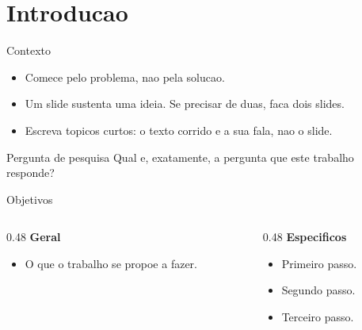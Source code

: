 \section{Introducao}

\begin{frame}{Contexto}
  \begin{itemize}
    \item Comece pelo problema, nao pela solucao.
    \item Um slide sustenta uma ideia. Se precisar de duas, faca dois slides.
    \item Escreva topicos curtos: o texto corrido e a sua fala, nao o slide.
  \end{itemize}

  \vspace{1em}
  \begin{block}{Pergunta de pesquisa}
    Qual e, exatamente, a pergunta que este trabalho responde?
  \end{block}
\end{frame}

\begin{frame}{Objetivos}
  \begin{columns}[T]
    \begin{column}{0.48\textwidth}
      \textbf{Geral}
      \begin{itemize}
        \item O que o trabalho se propoe a fazer.
      \end{itemize}
    \end{column}
    \begin{column}{0.48\textwidth}
      \textbf{Especificos}
      \begin{itemize}
        \item Primeiro passo.
        \item Segundo passo.
        \item Terceiro passo.
      \end{itemize}
    \end{column}
  \end{columns}

\end{frame}
